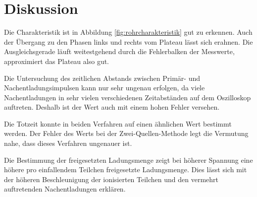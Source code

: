 \section{Diskussion}
\label{sec:Diskussion}

Die Charakteristik ist in Abbildung \ref{fig:rohrcharakteristik} gut zu erkennen.
Auch der Übergang zu den Phasen links und rechts vom Plateau lässt sich erahnen.
Die Ausgleichsgerade läuft weitestgehend durch die Fehlerbalken der Messwerte, approximiert
das Plateau also gut.

Die Untersuchung des zeitlichen Abstands zwischen Primär- und Nachentladungsimpulsen
kann nur sehr ungenau erfolgen, da viele Nachentladungen in sehr vielen verschiedenen
Zeitabständen auf dem Oszilloskop auftreten. Deshalb ist der Wert auch mit einem hohen Fehler
versehen.

Die Totzeit konnte in beiden Verfahren auf einen ähnlichen Wert bestimmt werden.
Der Fehler des Werts bei der Zwei-Quellen-Methode legt die Vermutung nahe, dass
dieses Verfahren ungenauer ist.

Die Bestimmung der freigesetzten Ladungsmenge zeigt bei höherer Spannung eine höhere
pro einfallendem Teilchen freigesetzte Ladungsmenge. Dies lässt sich mit der höheren
Beschleunigung der ionisierten Teilchen und den vermehrt auftretenden Nachentladungen
erklären.
